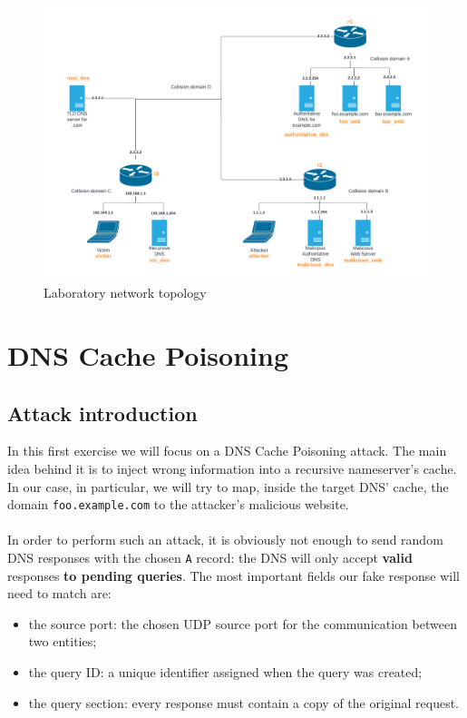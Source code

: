 \documentclass[11pt,a4paper]{article}
\begin{document}
\begin{figure}[h!]
  \centering
  \includegraphics[width=\textwidth]{network-topology.png}
  \caption{Laboratory network topology}
\end{figure}

\section{DNS Cache Poisoning}

\subsection{Attack introduction}
In this first exercise we will focus on a DNS Cache Poisoning attack. The main idea behind it is to inject wrong information into a recursive nameserver's cache. In our case, in particular, we will try to map, inside the target DNS' cache, the domain \texttt{foo.example.com} to the attacker's malicious website.
\\
\\
\noindent
In order to perform such an attack, it is obviously not enough to send random DNS responses with the chosen \texttt{A} record: the DNS will only accept \textbf{valid} responses \textbf{to pending queries}. The most important fields our fake response will need to match are:
\begin{itemize}
    \item the source port: the chosen UDP source port for the communication between two entities;
    \item the query ID: a unique identifier assigned when the query was created;
    \item the query section: every response must contain a copy of the original request.
\end{itemize}
\end{document}
